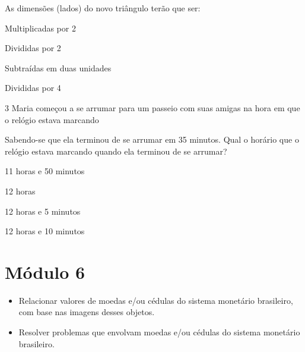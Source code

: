 As dimensões (lados) do novo triângulo terão que ser:

\begin{escolha}
\item
  Multiplicadas por 2
\item
  Divididas por 2
\item
  Subtraídas em duas unidades
\item
  Divididas por 4
\end{escolha}


\num{3} Maria começou a se arrumar para um passeio com suas amigas na hora
em que o relógio estava marcando


Sabendo-se que ela terminou de se arrumar em 35 minutos. Qual o horário
que o relógio estava marcando quando ela terminou de se arrumar?

\begin{escolha}
\item
  11 horas e 50 minutos
\item
  12 horas
\item
  12 horas e 5 minutos
\item
  12 horas e 10 minutos
\end{escolha}


\chapter{Módulo 6}


\begin{itemize}
\item Relacionar valores de moedas e/ou cédulas do sistema monetário
brasileiro, com base nas imagens desses objetos.

\item Resolver problemas que envolvam moedas e/ou cédulas do sistema
monetário brasileiro.
\end{itemize}

